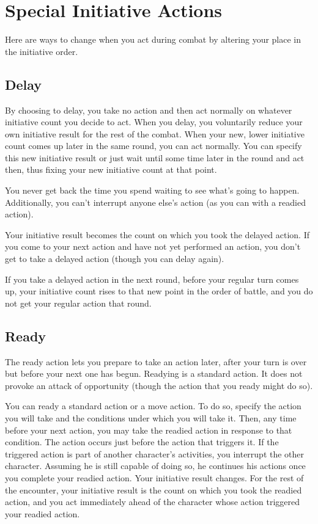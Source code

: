 \section{Special Initiative Actions}
Here are ways to change when you act during combat by altering your place in the initiative order.

\subsection{Delay}
By choosing to delay, you take no action and then act normally on whatever initiative count you decide to act. When you delay, you voluntarily reduce your own initiative result for the rest of the combat. When your new, lower initiative count comes up later in the same round, you can act normally. You can specify this new initiative result or just wait until some time later in the round and act then, thus fixing your new initiative count at that point.

You never get back the time you spend waiting to see what's going to happen. Additionally, you can't interrupt anyone else's action (as you can with a readied action).

 Your initiative result becomes the count on which you took the delayed action. If you come to your next action and have not yet performed an action, you don't get to take a delayed action (though you can delay again).

If you take a delayed action in the next round, before your regular turn comes up, your initiative count rises to that new point in the order of battle, and you do not get your regular action that round.

\subsection{Ready}
The ready action lets you prepare to take an action later, after your turn is over but before your next one has begun. Readying is a standard action. It does not provoke an attack of opportunity (though the action that you ready might do so).

 You can ready a standard action or a move action. To do so, specify the action you will take and the conditions under which you will take it. Then, any time before your next action, you may take the readied action in response to that condition. The action occurs just before the action that triggers it. If the triggered action is part of another character's activities, you interrupt the other character. Assuming he is still capable of doing so, he continues his actions once you complete your readied action. Your initiative result changes. For the rest of the encounter, your initiative result is the count on which you took the readied action, and you act immediately ahead of the character whose action triggered your readied action.

